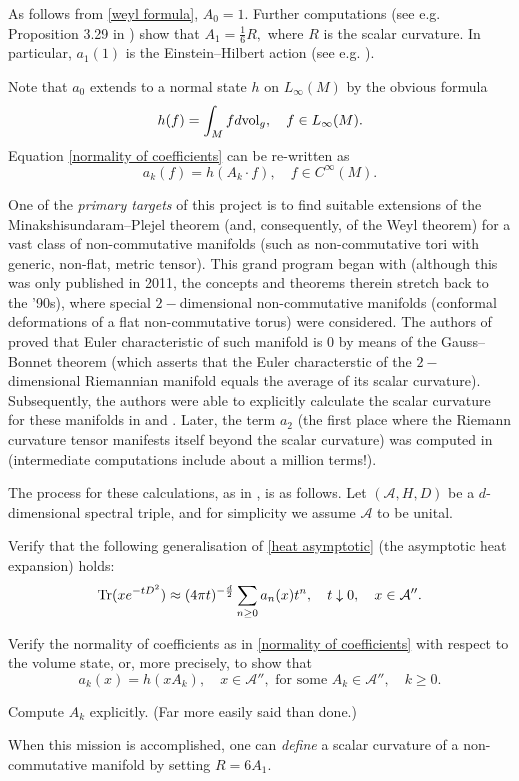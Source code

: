 \documentclass[12pt]{article}
\begin{document}
As follows from \eqref{weyl formula}, $A_0=1.$ Further computations (see e.g. Proposition 3.29 in \cite{Rosenberg}) show that $A_1=\frac16 R,$ where $R$ is the scalar curvature. In particular, $a_1(1)$ is the Einstein--Hilbert action (see e.g. \cite{Connes-book}).

Note that $a_0$ extends to a normal state $h$ on $L_{\infty}(M)$ by the obvious formula
$$h(f)=\int_M fd{\rm vol}_g,\quad f\in L_{\infty}(M).$$
Equation \eqref{normality of coefficients} can be re-written as
$$a_k(f)=h(A_k\cdot f),\quad f\in C^{\infty}(M).$$

One of the {\it primary targets} of this project is to find suitable extensions 
of the Minakshisundaram--Plejel theorem (and, consequently, of the Weyl theorem) 
for a vast class of non-commutative manifolds (such as non-commutative tori with 
generic, non-flat, metric tensor). 
This grand program began with \cite{ConnesTretkoff} 
(although this was only published in 2011, the concepts and theorems therein
stretch back to the '90s), where special $2-$dimensional non-commutative manifolds
(conformal deformations of a flat non-commutative torus) were considered.
The authors of \cite{ConnesTretkoff} proved that Euler characteristic of such 
manifold is $0$ by means of the Gauss--Bonnet theorem (which asserts that the Euler 
characterstic of the $2-$dimensional Riemannian manifold equals the average of
its scalar curvature). 
Subsequently, the authors were able to explicitly calculate the scalar curvature for these manifolds in \cite{ConnesMoscovici_curvature} and \cite{FathizadehKhalkhali}.
Later, the term $a_2$ (the first place where the Riemann curvature tensor manifests itself beyond the scalar curvature) was computed in \cite{ConnesFathizadeh} (intermediate computations include about a million terms!).

The process for these calculations, as in \cite{ConnesTretkoff}, is as follows.
Let $(\mathcal A,H,D)$ be a $d$-dimensional spectral triple, and for simplicity
we assume $\mathcal A$ to be unital.
\begin{steps}
\item\label{raph2} Verify that the following generalisation of \eqref{heat asymptotic} (the asymptotic heat expansion) holds:
$${\rm Tr}(xe^{-tD^2})\approx (4\pi t)^{-\frac{d}{2}} \sum_{n\geq0}a_n(x)t^n,\quad t\downarrow0,\quad x\in\mathcal{A}''.$$
\item\label{raph3} Verify the normality of coefficients as in \eqref{normality of coefficients} with respect to the volume state, or, more precisely, to show that
$$a_k(x)=h(xA_k),\quad x\in\mathcal{A}'',\mbox{ for some }A_k\in\mathcal{A}'',\quad k\geq0.$$
\item\label{raph4} Compute $A_k$ explicitly. (Far more easily said than done.)
\end{steps}
When this mission is accomplished, one can {\it define} a scalar curvature of a non-commutative manifold by setting $R=6A_1.$
\end{document}
